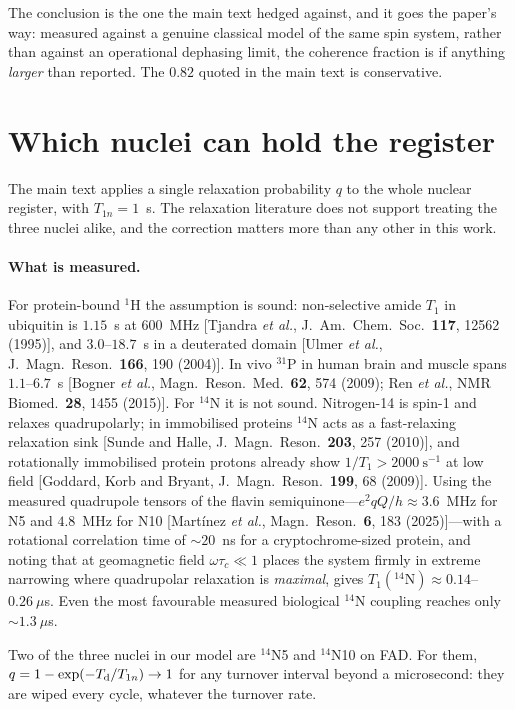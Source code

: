 \documentclass[aps,prx,reprint,superscriptaddress,nofootinbib,floatfix]{revtex4-2}
\begin{document}
The conclusion is the one the main text hedged against, and it goes the paper's
way: measured against a genuine classical model of the same spin system, rather
than against an operational dephasing limit, the coherence fraction is if
anything \emph{larger} than reported. The $0.82$ quoted in the main text is
conservative.

\section{Which nuclei can hold the register}
\label{sec:nuclide}
The main text applies a single relaxation probability $q$ to the whole nuclear
register, with $T_{1n}=1$~s. The relaxation literature does not support treating
the three nuclei alike, and the correction matters more than any other in this
work.

\paragraph*{What is measured.} For protein-bound $^1$H the assumption is sound:
non-selective amide $T_1$ in ubiquitin is $1.15$~s at $600$~MHz
[Tjandra \textit{et al.}, J.~Am.~Chem.~Soc.\ \textbf{117}, 12562 (1995)], and
$3.0$--$18.7$~s in a deuterated domain [Ulmer \textit{et al.}, J.~Magn.~Reson.\
\textbf{166}, 190 (2004)]. In vivo $^{31}$P in human brain and muscle spans
$1.1$--$6.7$~s [Bogner \textit{et al.}, Magn.~Reson.~Med.\ \textbf{62}, 574 (2009); Ren \textit{et al.}, NMR Biomed.\ \textbf{28}, 1455 (2015)]. For $^{14}$N it is not sound. Nitrogen-14 is
spin-1 and relaxes quadrupolarly; in immobilised proteins $^{14}$N acts as a
fast-relaxing relaxation sink [Sunde and Halle, J.~Magn.~Reson.\ \textbf{203}, 257 (2010)], and rotationally immobilised
protein protons already show $1/T_1>2000~\mathrm{s}^{-1}$ at low
field [Goddard, Korb and Bryant, J.~Magn.~Reson.\ \textbf{199}, 68 (2009)]. Using the measured quadrupole tensors of the flavin
semiquinone---$e^2qQ/h\approx3.6$~MHz for N5 and $4.8$~MHz for N10
[Mart\'inez \textit{et al.}, Magn.~Reson.\ \textbf{6}, 183 (2025)]---with a
rotational correlation time of $\sim20$~ns for a cryptochrome-sized protein, and
noting that at geomagnetic field $\omega\tau_c\ll1$ places the system firmly in
extreme narrowing where quadrupolar relaxation is \emph{maximal}, gives
$T_1(^{14}\mathrm{N})\approx0.14$--$0.26~\mu$s. Even the most favourable measured
biological $^{14}$N coupling reaches only $\sim1.3~\mu$s.

Two of the three nuclei in our model are $^{14}$N5 and $^{14}$N10 on FAD. For
them, $q=1-\exp(-T_{\rm d}/T_{1n})\to1$ for any turnover interval beyond a
microsecond: they are wiped every cycle, whatever the turnover rate.
\end{document}

